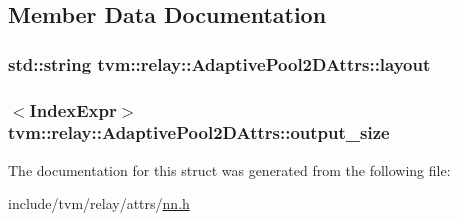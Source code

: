 \subsection{Member Data Documentation}
\subsubsection[{\texorpdfstring{layout}{layout}}]{\setlength{\rightskip}{0pt plus 5cm}std\+::string tvm\+::relay\+::\+Adaptive\+Pool2\+D\+Attrs\+::layout}\hypertarget{structtvm_1_1relay_1_1AdaptivePool2DAttrs_a5d020266c4e9f570c051bdde64872891}{}\label{structtvm_1_1relay_1_1AdaptivePool2DAttrs_a5d020266c4e9f570c051bdde64872891}
\subsubsection[{\texorpdfstring{output\+\_\+size}{output_size}}]{$<${\bf Index\+Expr}$>$ tvm\+::relay\+::\+Adaptive\+Pool2\+D\+Attrs\+::output\+\_\+size}\hypertarget{structtvm_1_1relay_1_1AdaptivePool2DAttrs_a545f40ec0dbdf52f628bebcc23a63950}{}\label{structtvm_1_1relay_1_1AdaptivePool2DAttrs_a545f40ec0dbdf52f628bebcc23a63950}


The documentation for this struct was generated from the following file\+:\begin{DoxyCompactItemize}
\item 
include/tvm/relay/attrs/\hyperlink{include_2tvm_2relay_2attrs_2nn_8h}{nn.\+h}\end{DoxyCompactItemize}
